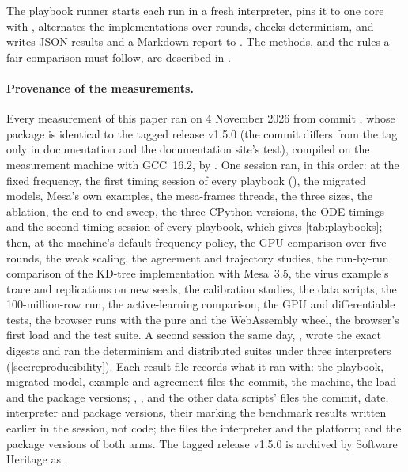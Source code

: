 The playbook runner starts each run in a fresh interpreter, pins it to one core with
, alternates the implementations over rounds, checks determinism, and writes JSON
results and a Markdown report to . The methods, and the
rules a fair comparison must follow, are described in .

\paragraph{Provenance of the measurements.} Every measurement of this paper ran on
4 November 2026 from commit , whose  package is identical to the
tagged release v1.5.0 (the commit differs from the tag only in documentation and the documentation site's test), compiled on
the measurement machine with GCC~16.2, by . One session
ran, in this order: at the fixed frequency, the first timing session of every playbook
(), the migrated models, Mesa's own examples, the
mesa-frames threads, the three sizes, the ablation, the end-to-end sweep, the three CPython
versions, the ODE timings and the second timing session of every playbook, which gives
\cref{tab:playbooks}; then, at the machine's default frequency policy, the GPU comparison over
five rounds, the weak scaling, the agreement and trajectory studies, the run-by-run comparison
of the KD-tree implementation with Mesa~3.5, the virus example's trace and replications on
new seeds, the calibration studies, the data scripts, the 100-million-row run, the
active-learning comparison, the GPU and differentiable tests, the browser runs with the pure
and the WebAssembly wheel, the browser's first load and the test suite. A second session the
same day, , wrote the exact digests and ran the
determinism and distributed suites under three interpreters (\cref{sec:reproducibility}).
Each result file records what it ran with: the playbook, migrated-model, example and
agreement files the commit, the machine, the load and the package versions;
, ,  and the other data
scripts' files the commit, date, interpreter and package versions, their 
marking the benchmark results written earlier in the session, not code; the
 files the interpreter and the platform; and  the
package versions of both arms. The tagged release v1.5.0 is archived by Software Heritage as
.

